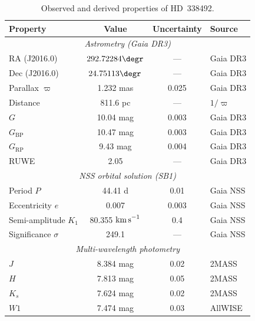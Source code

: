 \documentclass[usenatbib,fleqn]{mnras}
\newcommand{\kms}{{\rm km\,s}^{-1}}
\begin{document}




\begin{table}
\centering
\caption{Observed and derived properties of HD~338492.}
\label{tab:observed}
\begin{tabular}{lccl}
\toprule
Property & Value & Uncertainty & Source \\
\midrule
\multicolumn{4}{c}{\textit{Astrometry (Gaia DR3)}} \\
RA (J2016.0)           & $292.72284\degr$    & ---      & Gaia DR3 \\
Dec (J2016.0)          & $24.75113\degr$     & ---      & Gaia DR3 \\
Parallax $\varpi$      & 1.232 mas           & 0.025    & Gaia DR3 \\
Distance               & 811.6 pc            & ---      & $1/\varpi$ \\
$G$                    & 10.04 mag           & 0.003    & Gaia DR3 \\
$G_\mathrm{BP}$        & 10.47 mag           & 0.003    & Gaia DR3 \\
$G_\mathrm{RP}$        & 9.43 mag            & 0.004    & Gaia DR3 \\
RUWE                   & 2.05                & ---      & Gaia DR3 \\
\midrule
\multicolumn{4}{c}{\textit{NSS orbital solution (SB1)}} \\
Period $P$             & 44.41 d             & 0.01     & Gaia NSS \\
Eccentricity $e$       & 0.007               & 0.003    & Gaia NSS \\
Semi-amplitude $K_1$   & 80.355 $\kms$       & 0.4      & Gaia NSS \\
Significance $\sigma$  & 249.1               & ---      & Gaia NSS \\
\midrule
\multicolumn{4}{c}{\textit{Multi-wavelength photometry}} \\
$J$   & 8.384 mag & 0.02 & 2MASS \\
$H$   & 7.813 mag & 0.05 & 2MASS \\
$K_s$ & 7.624 mag & 0.02 & 2MASS \\
$W1$  & 7.474 mag & 0.03 & AllWISE \\

\end{tabular}
\end{table}
\end{document}
